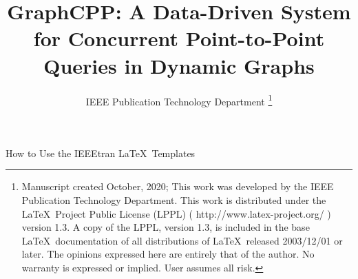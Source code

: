 \documentclass[lettersize,journal]{IEEEtran} %
\begin{document}
\title{GraphCPP: A Data-Driven System for Concurrent Point-to-Point Queries in Dynamic Graphs} %
\author{IEEE Publication Technology Department %
\thanks{Manuscript created October, 2020; This work was developed by the IEEE Publication Technology Department. This work is distributed under the \LaTeX \ Project Public License (LPPL) ( http://www.latex-project.org/ ) version 1.3. A copy of the LPPL, version 1.3, is included in the base \LaTeX \ documentation of all distributions of \LaTeX \ released 2003/12/01 or later. The opinions expressed here are entirely that of the author. No warranty is expressed or implied. User assumes all risk.}} %

{How to Use the IEEEtran \LaTeX \ Templates} 

\maketitle %
\end{document}
